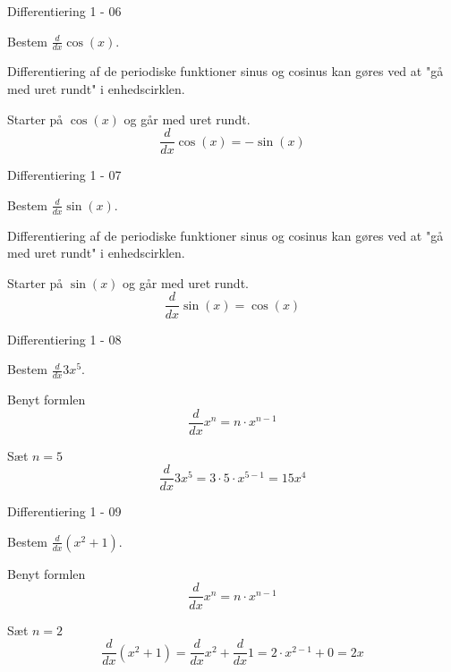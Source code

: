 \documentclass{article}
\begin{document}
\begin{exercise}{Differentiering 1 - 06}
	
	Bestem $\frac{d}{dx} \cos(x) $.
	
	
	\hint
	
	Differentiering af de periodiske funktioner sinus og cosinus kan gøres ved at "gå med uret rundt" i enhedscirklen.
	
	\hint 
	
	Starter på $\cos(x)$ og går med uret rundt.
	\[
	\frac{d}{dx} \cos(x) = -\sin(x)
	\]
	

	
\end{exercise}

\begin{exercise}{Differentiering 1 - 07}
	
	Bestem $\frac{d}{dx} \sin(x) $.


\hint

Differentiering af de periodiske funktioner sinus og cosinus kan gøres ved at "gå med uret rundt" i enhedscirklen.

\hint 

Starter på $\sin(x)$ og går med uret rundt.
\[
\frac{d}{dx} \sin(x) = \cos(x)
\]


\end{exercise}

\begin{exercise}{Differentiering 1 - 08}
	
	Bestem $\frac{d}{dx} 3 x^5$.
	
	
	\hint
	
	Benyt formlen
	\[
	\frac{d}{dx} x^n = n \cdot x^{n - 1}
	\]
	
	\hint
	
	Sæt $n = 5$
	\[
	\frac{d}{dx} 3 x^5 = 3 \cdot 5 \cdot x^{5 - 1} = 15 x^4
	\]
\end{exercise}

\begin{exercise}{Differentiering 1 - 09}
	
	Bestem $\frac{d}{dx} \left(x^2 + 1 \right)$.
	
	
	\hint
	
	Benyt formlen
	\[
	\frac{d}{dx} x^n = n \cdot x^{n - 1}
	\]
	
	\hint
	
	Sæt $n = 2$
	\[
	\frac{d}{dx} \left(x^2 + 1 \right) = \frac{d}{dx} x^2 + \frac{d}{dx} 1 =  2 \cdot x^{2 - 1} + 0 = 2 x
	\]
\end{exercise}
\end{document}
